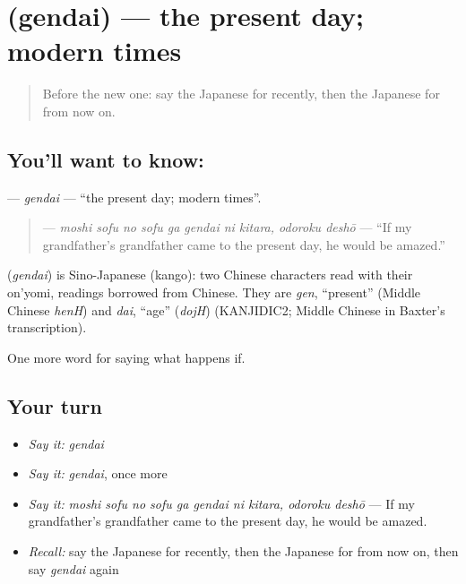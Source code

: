 \section[\texorpdfstring{\ja{げんだい} (gendai)}{げんだい (gendai)}]{ (gendai) — the present day; modern times}

\label{lesson:JA-C527-gendai}



\begin{quote}
Before the new one: say the Japanese for recently, then the Japanese for from now on.
\end{quote}

\subsection*{You'll want to know: }
\textbf{} — \emph{gendai} — \textquotedblleft{}the present day; modern times\textquotedblright{}.

\begin{quote}
\textbf{    } — \emph{moshi sofu no sofu ga gendai ni kitara, odoroku deshō} — \textquotedblleft{}If my grandfather's grandfather came to the present day, he would be amazed.\textquotedblright{}
\end{quote}

\begin{cousinweb}
\textbf{} (\emph{gendai}) is Sino-Japanese (kango): two Chinese characters read with their on'yomi, readings borrowed from Chinese. They are \emph{gen}, \textquotedblleft{}present\textquotedblright{} (Middle Chinese \emph{henH}) and \emph{dai}, \textquotedblleft{}age\textquotedblright{} (\emph{dojH}) (KANJIDIC2; Middle Chinese in Baxter's transcription).
\end{cousinweb}

\begin{grammarlens}[title={What you've built}]
One more word for saying what happens if.
\end{grammarlens}

\subsection*{Your turn}
\begin{itemize}
\raggedright
  \item \emph{Say it:} \emph{gendai}
  \item \emph{Say it:} \emph{gendai}, once more
  \item \emph{Say it:} \emph{moshi sofu no sofu ga gendai ni kitara, odoroku deshō} — If my grandfather's grandfather came to the present day, he would be amazed.
  \item \emph{Recall:} say the Japanese for recently, then the Japanese for from now on, then say \emph{gendai} again
\end{itemize}

